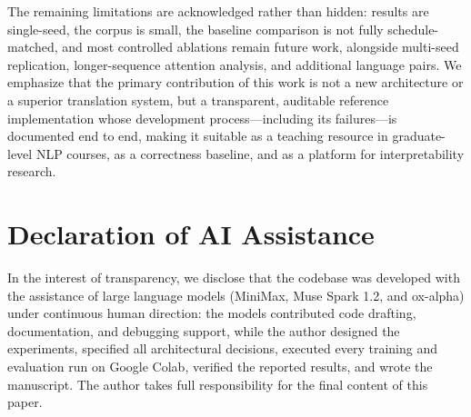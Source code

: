 The remaining limitations are acknowledged rather than hidden: results are single-seed, the corpus is small, the baseline comparison is not fully schedule-matched, and most controlled ablations remain future work, alongside multi-seed replication, longer-sequence attention analysis, and additional language pairs. We emphasize that the primary contribution of this work is not a new architecture or a superior translation system, but a transparent, auditable reference implementation whose development process---including its failures---is documented end to end, making it suitable as a teaching resource in graduate-level NLP courses, as a correctness baseline, and as a platform for interpretability research.

\section*{Declaration of AI Assistance}
In the interest of transparency, we disclose that the codebase was developed with the assistance of large language models (MiniMax, Muse Spark 1.2, and ox-alpha) under continuous human direction: the models contributed code drafting, documentation, and debugging support, while the author designed the experiments, specified all architectural decisions, executed every training and evaluation run on Google Colab, verified the reported results, and wrote the manuscript. The author takes full responsibility for the final content of this paper.
